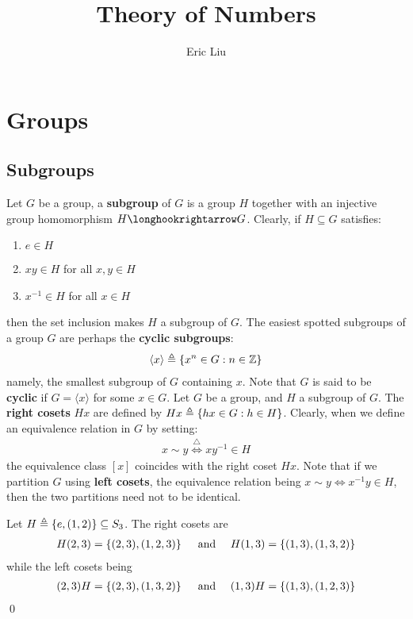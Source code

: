 \documentclass{report}
\title{Theory of Numbers}
\author{Eric Liu}
\date{}
\begin{document}
\maketitle
\newpage %

\tableofcontents
\pagebreak
\chapter{Groups}
\section{Subgroups}
Let $G$ be a group, a \textbf{subgroup} of $G$ is a group $H$ together with an injective group homomorphism $H \longhookrightarrow G$. Clearly, if $H \subseteq G$ satisfies:
\begin{enumerate}[label=(\roman*)]
  \item $e \in H$ 
  \item $xy \in H$ for all $x,y \in H$ 
  \item $x^{-1} \in H$ for all $x \in H$ 
\end{enumerate}
then the set inclusion makes $H$ a subgroup of $G$. The easiest spotted subgroups of a group $G$ are perhaps the  \textbf{cyclic subgroups}:  
\begin{align*}
\langle x\rangle \triangleq \left\{ x^{n}\in G: n\in\mathbb{Z} \right\}
\end{align*}
namely, the smallest subgroup of $G$ containing $x$. Note that $G$ is said to be \textbf{cyclic} if $G= \langle x\rangle $ for some $x \in G$.  Let $G$ be a group, and $H$ a subgroup of  $G$. The \textbf{right cosets} $Hx$ are defined by $Hx\triangleq \left\{ hx \in G: h \in H \right\}$. Clearly, when we define an equivalence relation in $G$ by setting: 
\begin{align*}
x\sim  y \overset{\triangle}{\iff } xy^{-1} \in H
\end{align*}
the equivalence class $[x]$ coincides with the right coset $Hx$. Note that if we partition $G$ using \textbf{left cosets}, the equivalence relation being $x\sim  y \iff  x^{-1}y\in H$, then the two partitions need not to be identical. 
\begin{example}
Let $H\triangleq \left\{ e,(1,2) \right\}\subseteq S_3$. The right cosets are 
\begin{align*}
H(2,3)=\left\{ (2,3),(1,2,3) \right\}\quad \text{ and }\quad  H(1,3)=\left\{ (1,3),(1,3,2) \right\}
\end{align*}
while the left cosets being
\begin{align*}
(2,3)H= \left\{ (2,3),(1,3,2) \right\} \quad \text{ and }\quad (1,3)H= \left\{ (1,3),(1,2,3) \right\}
\end{align*}
\qed
\end{example}
\end{document}
